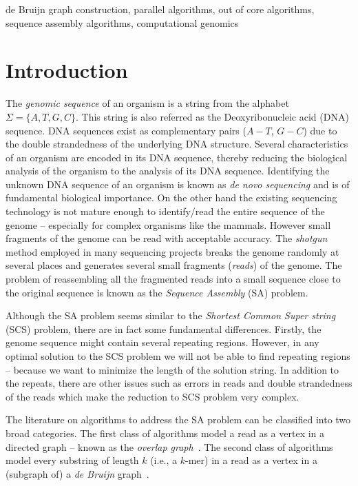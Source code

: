 \documentclass[11pt,conference,twocolumn]{IEEEtran}
\begin{document}
\begin{keywords}
de Bruijn graph construction, parallel algorithms, out of core algorithms,
sequence assembly algorithms, computational genomics
\end{keywords}

\section{Introduction}

\PARstart The {\em genomic sequence} of an organism is a string from the alphabet $\Sigma=\{A,T,G,C\}$.
This string is also referred as the Deoxyribonucleic acid (DNA) sequence. DNA sequences exist as 
complementary pairs ($A-T$, $G-C$) due to the double strandedness of the underlying DNA structure. 
Several characteristics of an organism are encoded in its DNA sequence, thereby reducing the 
biological analysis of the organism to the analysis of its DNA sequence. Identifying the unknown 
DNA sequence of an organism is known as {\em de novo sequencing} and is of fundamental biological 
importance. On the other hand the existing sequencing technology is not mature enough to identify/read the 
entire sequence of the genome -- especially for complex organisms like the mammals. However small 
fragments of the genome can be read with acceptable accuracy.  The {\em shotgun} method employed 
in many sequencing projects breaks the genome randomly at several places and generates several
small fragments ({\em reads}) of the genome. The problem of reassembling all the fragmented reads into 
a small sequence close to the original sequence is known as the {\em Sequence Assembly }(SA) problem. 

Although the SA problem seems similar to the {\em Shortest Common Super string} (SCS) problem, there are
in fact some fundamental differences. Firstly, the genome sequence might contain several repeating
regions. However, in any optimal solution to the SCS problem we will not be able to find repeating 
regions -- because we want to minimize the length of the solution string. In addition to the repeats, there 
are other issues such as errors in reads and double strandedness of the reads which make the 
reduction to SCS problem very complex. 

The literature on algorithms to address the SA problem can be classified into two broad categories. 
The first class of algorithms model a read as a vertex in a directed graph -- known as the 
{\em overlap graph}~\cite{myers95}. The second class 
of algorithms model every substring of length $k$ (i.e., a $k$-mer) in a read as a vertex in a (subgraph of)
a {\em de Bruijn} graph~\cite{pevzner01}.
\end{document}
